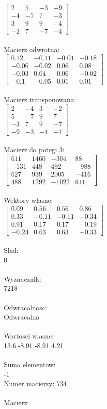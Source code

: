 \documentclass[a4paper,12pt]{article}
\begin{document}
$\begin{bmatrix} 2&5&-3&-9\\-4&-7&7&-3\\3&9&9&-4\\-2&7&-7&-4 \end{bmatrix}$
\\
\\
Macierz odwrotna:\\

$\begin{bmatrix} 0.12&-0.11&-0.01&-0.18\\-0.06&-0.02&0.06&0.08\\-0.03&0.04&0.06&-0.02\\-0.1&-0.05&0.01&0.01 \end{bmatrix}$
\\
\\
Macierz transponowana:\\

$\begin{bmatrix} 2&-4&3&-2\\5&-7&9&7\\-3&7&9&-7\\-9&-3&-4&-4 \end{bmatrix}$
\\
\\
Macierz do potegi 3:\\

$\begin{bmatrix} 611&1460&-304&88\\-131&448&492&-988\\627&939&2005&-416\\488&1292&-1022&611 \end{bmatrix}$
\\
\\
Wektory wlasne:\\

$\begin{bmatrix} 0.09&0.56&0.56&0.86\\0.33&-0.11&-0.11&-0.34\\0.91&0.17&0.17&-0.19\\-0.24&0.63&0.63&-0.33 \end{bmatrix}$
\\
\\
Slad:\\
0
\\
\\
Wyznacznik:\\
7218
\\
\\
Odwracalnosc:\\
Odwracalna
\\
\\
Wartosci wlasne:\\
13.6 -8.91 -8.91 4.21
\\
\\
Suma elementow:\\
-1
\\
\newpage
Numer macierzy:
734
\\
\\
Macierz:\\
\end{document}
